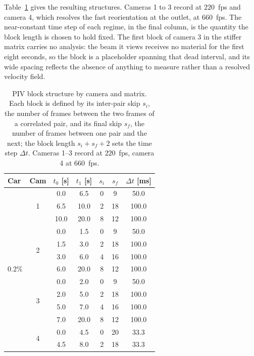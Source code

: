 \documentclass[%
  aip,
  pof,
  reprint,
  floatfix
]{revtex4-2}
\begin{document}
Table~\ref{tab:sup_piv_blocks} gives the resulting structures. Cameras 1 to 3 record at $220$~fps and camera 4, which resolves the fast reorientation at the outlet, at $660$~fps. The near-constant time step of each regime, in the final column, is the quantity the block length is chosen to hold fixed. The first block of camera 3 in the stiffer matrix carries no analysis: the beam it views receives no material for the first eight seconds, so the block is a placeholder spanning that dead interval, and its wide spacing reflects the absence of anything to measure rather than a resolved velocity field.

\begin{table}[htb]
\centering
\caption{PIV block structure by camera and matrix. Each block is defined by its inter-pair skip $s_i$, the number of frames between the two frames of a correlated pair, and its final skip $s_f$, the number of frames between one pair and the next; the block length $s_i + s_f + 2$ sets the time step $\Delta t$. Cameras 1--3 record at $220$~fps, camera 4 at $660$~fps.}
\label{tab:sup_piv_blocks}
\begin{tabular}{l c c c c c c}
\toprule
\textbf{Car} & \textbf{Cam} & $t_0$ [s] & $t_1$ [s] & $s_i$ & $s_f$ & $\Delta t$ [ms] \\
\midrule
\multirow{14}{*}{0.2\%}
 & \multirow{3}{*}{1} &  0.0 &  6.5 & 0 &  9 &  50.0 \\
 &                    &  6.5 & 10.0 & 2 & 18 & 100.0 \\
 &                    & 10.0 & 20.0 & 8 & 12 & 100.0 \\
\cmidrule(lr){2-7}
 & \multirow{4}{*}{2} &  0.0 &  1.5 & 0 &  9 &  50.0 \\
 &                    &  1.5 &  3.0 & 2 & 18 & 100.0 \\
 &                    &  3.0 &  6.0 & 4 & 16 & 100.0 \\
 &                    &  6.0 & 20.0 & 8 & 12 & 100.0 \\
\cmidrule(lr){2-7}
 & \multirow{4}{*}{3} &  0.0 &  2.0 & 0 &  9 &  50.0 \\
 &                    &  2.0 &  5.0 & 2 & 18 & 100.0 \\
 &                    &  5.0 &  7.0 & 4 & 16 & 100.0 \\
 &                    &  7.0 & 20.0 & 8 & 12 & 100.0 \\
\cmidrule(lr){2-7}
 & \multirow{3}{*}{4} &  0.0 &  4.5 & 0 & 20 &  33.3 \\
 &                    &  4.5 &  8.0 & 2 & 18 &  33.3 \\

\end{tabular}
\end{table}
\end{document}
